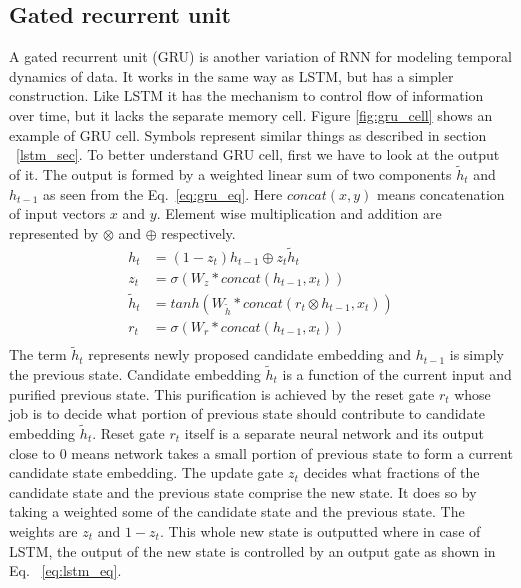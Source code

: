 \documentclass[10pt,twocolumn,letterpaper]{article}
\begin{document}
\subsection{Gated recurrent unit}
A gated recurrent unit (GRU) is another variation of RNN for modeling temporal dynamics of data. It works in the same way as LSTM, but has a simpler construction. Like LSTM it has the mechanism to control flow of information over time, but it lacks the separate memory cell. 
Figure \ref{fig:gru_cell} shows an example of GRU cell. Symbols represent similar things as described in section ~\ref{lstm_sec}. 
To better understand GRU cell, first we have to look at the output of it. The output is formed by a weighted linear sum of two components $\tilde{h}_t$ and $h_{t-1}$ as seen from the Eq.~\ref{eq:gru_eq}. Here $concat(x,y)$ means concatenation of input vectors $x$ and $y$. Element wise multiplication and addition are represented by $\otimes$ and $\oplus$ respectively.
\begin{equation}
	\label{eq:gru_eq}
	\begin{aligned}
		h_t & = (1-z_{t})h_{t-1} \oplus z_{t}\tilde{h}_t \\
		z_{t} &= \sigma(W_z*concat(h_{t-1}, x_t)) \\
		\tilde{h}_t &= tanh(W_{\tilde{h}}*concat(r_t \otimes h_{t-1}, x_t)) \\
		r_t &= \sigma(W_r*concat(h_{t-1}, x_t)) \\
	\end{aligned}
\end{equation}
The term $\tilde{h}_t$ represents newly proposed candidate embedding and $h_{t-1}$ is simply the previous state. Candidate embedding $\tilde{h}_t$ is a function of the current input and purified previous state. This purification is achieved by the reset gate $r_{t}$ whose job is to decide what portion of previous state should contribute to candidate embedding $\tilde{h}_t$. Reset gate $r_{t}$ itself is a separate neural network and its output close to $0$ means network takes a small portion of previous state to form a current candidate state embedding. The update gate $z_{t}$ decides what fractions of the candidate state and the previous state comprise the new state. It does so by taking a weighted some of the candidate state and the previous state. The weights are $z_{t}$ and $1-z_{t}$. This whole new state is outputted where in case of LSTM, the output of the new state is controlled by an output gate as shown in Eq. ~\ref{eq:lstm_eq}.  
\end{document}
